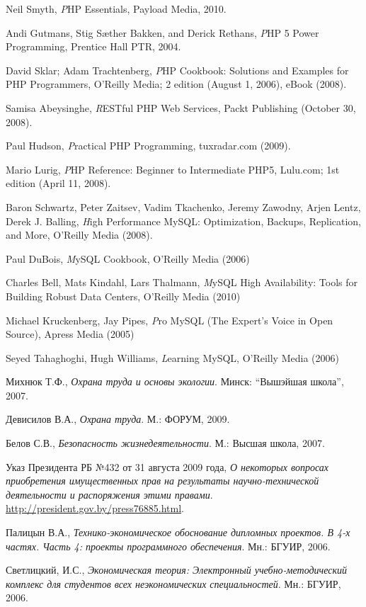 \begin{thebibliography}{99}


\bibitem{}
  Neil Smyth,
  \emph PHP Essentials,
  Payload Media,
  2010.

\bibitem{}
  Andi Gutmans, Stig Sæther Bakken, and Derick Rethans,
  \emph PHP 5 Power Programming,
  Prentice Hall PTR,
  2004.

\bibitem{}
  David Sklar; Adam Trachtenberg,
  \emph PHP Cookbook: Solutions and Examples for PHP Programmers,
  O'Reilly Media; 2 edition (August 1, 2006), eBook (2008).
  
\bibitem{}
  Samisa Abeysinghe,
  \emph RESTful PHP Web Services,
  Packt Publishing (October 30, 2008).

\bibitem{}
  Paul Hudson,
  \emph Practical PHP Programming,
  tuxradar.com (2009).

\bibitem{}
  Mario Lurig,
  \emph PHP Reference: Beginner to Intermediate PHP5,
  Lulu.com; 1st edition (April 11, 2008).

\bibitem{}
  Baron Schwartz, Peter Zaitsev, Vadim Tkachenko, Jeremy Zawodny, Arjen Lentz, Derek J. Balling,
  \emph High Performance MySQL: Optimization, Backups, Replication, and More,
  O'Reilly Media (2008).


\bibitem{}
  Paul DuBois,
  \emph MySQL Cookbook,
  O'Reilly Media (2006)

\bibitem{}
  Charles Bell, Mats Kindahl, Lars Thalmann,
  \emph MySQL High Availability: Tools for Building Robust Data Centers,
  O'Reilly Media (2010)

\bibitem{}
  Michael Kruckenberg, Jay Pipes,
  \emph Pro MySQL (The Expert's Voice in Open Source),
  Apress Media (2005)

\bibitem{}
  Seyed Tahaghoghi, Hugh Williams,
  \emph Learning MySQL,
  O'Reilly Media (2006)
 
  Михнюк Т.Ф.,
  \emph{Охрана труда и основы экологии}.
  Минск: ``Вышэйшая школа'',
  2007.

  Девисилов В.А.,
  \emph{Охрана труда}.
  М.: ФОРУМ,
  2009.

  Белов С.В.,
  \emph{Безопасность жизнедеятельности}.
  М.: Высшая школа,
  2007.

  Указ Президента РБ №432 от 31 августа 2009 года,
  \emph{О некоторых вопросах приобретения имущественных прав на результаты научно-технической деятельности и распоряжения этими правами}.
  \href{http://president.gov.by/press76885.html}{http://president.gov.by/press76885.html}.

  Палицын В.А.,
  \emph{Технико-экономическое обоснование дипломных проектов. В 4-х частях. Часть 4: проекты программного обеспечения}.
  Мн.: БГУИР,
  2006.

  Светлицкий, И.С.,
  \emph{Экономическая теория: Электронный учебно-методический комплекс для студентов всех неэкономических специальностей}.
  Мн.: БГУИР,
  2006.


\end{thebibliography}
